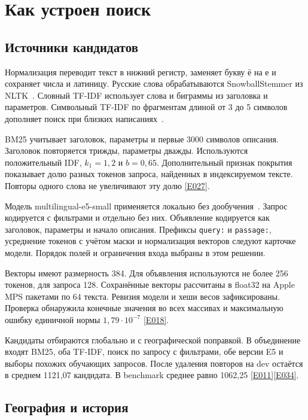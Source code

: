 \documentclass{article}
\newcommand{\ev}[1]{\href{https://github.com/revefffect/avito-contest/blob/main/evidence/INDEX.md\#E#1}{[E#1]}}
\newcommand{\file}[1]{\texttt{\small #1}}
\begin{document}
\section{Как устроен поиск}

\subsection{Источники кандидатов}

Нормализация переводит текст в нижний регистр, заменяет букву ё на е и сохраняет числа и латиницу. Русские слова обрабатываются SnowballStemmer из NLTK~\citep{nltk}. Словный TF-IDF использует слова и биграммы из заголовка и параметров. Символьный TF-IDF по фрагментам длиной от 3 до 5 символов дополняет поиск при близких написаниях~\citep{sklearn}.

BM25 учитывает заголовок, параметры и первые 3000 символов описания. Заголовок повторяется трижды, параметры дважды. Используются положительный IDF, $k_1=1{,}2$ и $b=0{,}65$. Дополнительный признак покрытия показывает долю разных токенов запроса, найденных в индексируемом тексте. Повторы одного слова не увеличивают эту долю \ev{027}.

Модель multilingual-e5-small применяется локально без дообучения~\citep{e5}. Запрос кодируется с фильтрами и отдельно без них. Объявление кодируется как заголовок, параметры и начало описания. Префиксы \file{query:} и \file{passage:}, усреднение токенов с учётом маски и нормализация векторов следуют карточке модели. Порядок полей и ограничения входа выбраны в этом решении.

Векторы имеют размерность 384. Для объявления используются не более 256 токенов, для запроса 128. Сохранённые векторы рассчитаны в float32 на Apple MPS пакетами по 64 текста. Ревизия модели и хеши весов зафиксированы. Проверка обнаружила конечные значения во всех массивах и максимальную ошибку единичной нормы $1{,}79\cdot10^{-7}$ \ev{018}.

Кандидаты отбираются глобально и с географической поправкой. В объединение входят BM25, оба TF-IDF, поиск по запросу с фильтрами, обе версии E5 и выборы похожих обучающих запросов. После удаления повторов на dev остаётся в среднем 1121{,}07 кандидата. В benchmark среднее равно 1062{,}25 \ev{011}\ev{034}.

\subsection{География и история}
\end{document}
